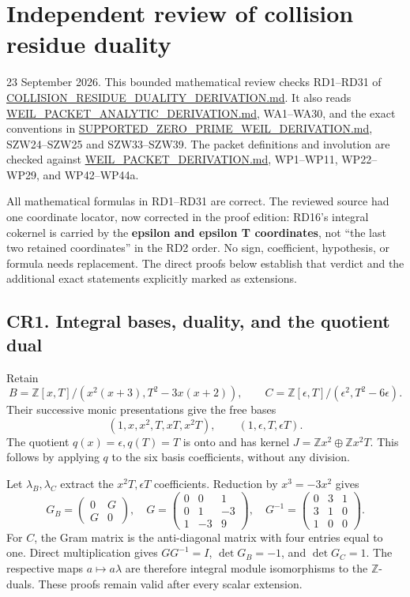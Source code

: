 \documentclass[
]{article}
\author{}
\date{}
\begin{document}
\section{Independent review of collision residue
duality}\label{independent-review-of-collision-residue-duality}

23 September 2026. This bounded mathematical review checks RD1--RD31 of
\href{../COLLISION_RESIDUE_DUALITY_DERIVATION.md}{COLLISION\_RESIDUE\_DUALITY\_DERIVATION.md}.
It also reads
\href{../WEIL_PACKET_ANALYTIC_DERIVATION.md}{WEIL\_PACKET\_ANALYTIC\_DERIVATION.md},
WA1--WA30, and the exact conventions in
\href{../SUPPORTED_ZERO_PRIME_WEIL_DERIVATION.md}{SUPPORTED\_ZERO\_PRIME\_WEIL\_DERIVATION.md},
SZW24--SZW25 and SZW33--SZW39. The packet definitions and involution are
checked against
\href{../WEIL_PACKET_DERIVATION.md}{WEIL\_PACKET\_DERIVATION.md},
WP1--WP11, WP22--WP29, and WP42--WP44a.

All mathematical formulas in RD1--RD31 are correct. The reviewed source
had one coordinate locator, now corrected in the proof edition: RD16's
integral cokernel is carried by the \textbf{epsilon and epsilon T
coordinates}, not ``the last two retained coordinates'' in the RD2
order. No sign, coefficient, hypothesis, or formula needs replacement.
The direct proofs below establish that verdict and the additional exact
statements explicitly marked as extensions.

\subsection{CR1. Integral bases, duality, and the quotient
dual}\label{cr1.-integral-bases-duality-and-the-quotient-dual}

Retain \[
B=\mathbb Z[x,T]/(x^2(x+3),T^2-3x(x+2)),\qquad
C=\mathbb Z[\epsilon,T]/(\epsilon^2,T^2-6\epsilon).
\] Their successive monic presentations give the free bases \[
(1,x,x^2,T,xT,x^2T),\qquad(1,\epsilon,T,\epsilon T).
\] The quotient \(q(x)=\epsilon,q(T)=T\) is onto and has kernel
\(J=\mathbb Zx^2\oplus\mathbb Zx^2T\). This follows by applying \(q\) to
the six basis coefficients, without any division.

Let \(\lambda_B,\lambda_C\) extract the \(x^2T,\epsilon T\)
coefficients. Reduction by \(x^3=-3x^2\) gives \[
G_B=\begin{pmatrix}0&G\\G&0\end{pmatrix},\quad
G=\begin{pmatrix}0&0&1\\0&1&-3\\1&-3&9\end{pmatrix},\quad
G^{-1}=\begin{pmatrix}0&3&1\\3&1&0\\1&0&0\end{pmatrix}.
\] For \(C\), the Gram matrix is the anti-diagonal matrix with four
entries equal to one. Direct multiplication gives \(GG^{-1}=I\),
\(\det G_B=-1\), and \(\det G_C=1\). The respective maps
\(a\mapsto a\lambda\) are therefore integral module isomorphisms to the
\(\mathbb Z\)-duals. These proofs remain valid after every scalar
extension.
\end{document}
